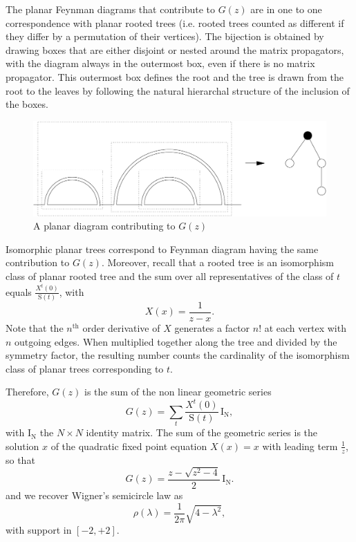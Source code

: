 \documentclass[10pt,here,feynmf]{article}
\begin{document}
The planar Feynman diagrams that contribute to $G(z)$ are in one to one correspondence with planar rooted trees (i.e. rooted trees counted as different if they differ by a permutation of their vertices).  The bijection is obtained by  drawing boxes that are either disjoint or nested around the matrix propagators, with the diagram always in the outermost box, even if there is no matrix propagator. This outermost box defines the root and the tree is drawn from the root to the leaves by following the natural hierarchal structure of the inclusion of the boxes.

\begin{figure}
\begin{center}
\includegraphics[width=15cm]{wigner.pdf}
\caption{A planar diagram contributing to $G(z)$}
\end{center}
\end{figure}

Isomorphic planar trees correspond to Feynman diagram having the same contribution to $G(z)$. Moreover, recall that a rooted tree is an isomorphism class of planar rooted tree and the sum over all representatives of the class of $t$ equals $\frac{X^{t}(0)}{\mathrm{S}(t)}$, with
\begin{equation}
X(x)=\frac{1}{z-x}.
\end{equation}
Note that the $n^{\mathrm{th}}$ order derivative of $X$ generates a factor $n!$ at each vertex with $n$ outgoing edges. When multiplied together along the tree and divided by the symmetry factor, the resulting number counts the cardinality of the isomorphism class of planar trees corresponding to $t$.

Therefore, $G(z)$ is the sum of the non linear geometric series
\begin{equation}
G(z)=\sum_{t}\frac{X^{t}(0)}{\mathrm{S}(t)}\,\mathrm{I_{N}},
\end{equation}
with $\mathrm{I_{N}}$ the $N\times N$ identity matrix. The sum of the geometric series is the solution $x$ of the quadratic fixed point equation $X(x)=x$ with leading term $\frac{1}{z}$, so that
\begin{equation}
G(z)=\frac{z-\sqrt{z^{2}-4}}{2}\,\mathrm{I_{N}}.
\end{equation}
and we recover Wigner's semicircle law as
\begin{equation}
\rho(\lambda)=\frac{1}{2\pi}\sqrt{4-\lambda^{2}},
\end{equation}
with support in $[-2,+2]$.
\end{document}
